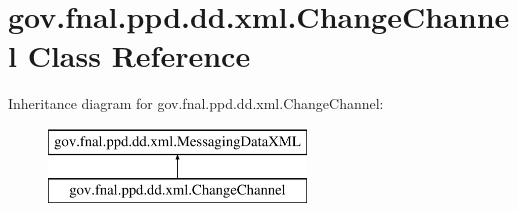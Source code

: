 \hypertarget{classgov_1_1fnal_1_1ppd_1_1dd_1_1xml_1_1ChangeChannel}{\section{gov.\-fnal.\-ppd.\-dd.\-xml.\-Change\-Channel Class Reference}
\label{classgov_1_1fnal_1_1ppd_1_1dd_1_1xml_1_1ChangeChannel}
}
Inheritance diagram for gov.\-fnal.\-ppd.\-dd.\-xml.\-Change\-Channel\-:\begin{figure}[H]
\begin{center}
\leavevmode
\includegraphics[height=2.000000cm]{classgov_1_1fnal_1_1ppd_1_1dd_1_1xml_1_1ChangeChannel}
\end{center}
\end{figure}
